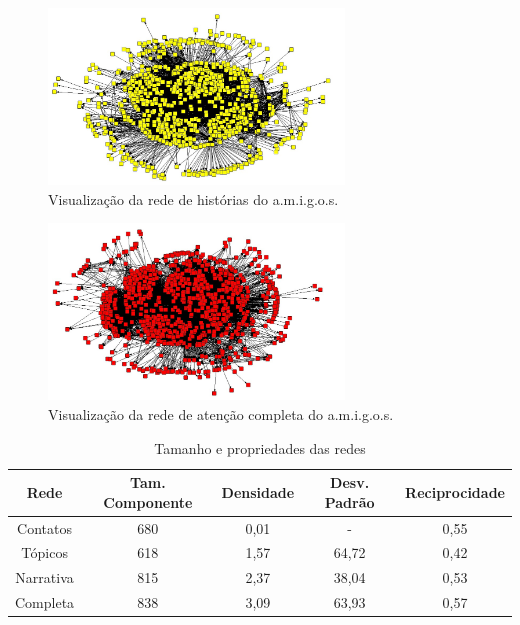 \begin{figure}[h!]
  \centering
    \includegraphics[width=0.7\textwidth]{imgs/narrativas.jpg}
  \caption{Visualização da rede de histórias do a.m.i.g.o.s.}
    \label{ap:fig:narrativas}
\end{figure}

\begin{figure}[h!]
  \centering
    \includegraphics[width=0.7\textwidth]{imgs/completa.jpg}
  \caption{Visualização da rede de atenção completa do a.m.i.g.o.s.}
    \label{ap:fig:completa}
\end{figure}

\begin{table} [htbp]
	\setlength{\arrayrulewidth}{2\arrayrulewidth}  %
	\setlength{\belowcaptionskip}{10pt}  %
	\caption{Tamanho e propriedades das redes} \centering   %
	\begin{tabular}{| c | c | c | c | c |}
	\hline
	Rede & Tam. Componente & Densidade & Desv. Padrão & Reciprocidade \\ \hline
	Contatos & 680 & 0,01 & - & 0,55 \\
	Tópicos & 618 & 1,57 & 64,72 & 0,42\\
	Narrativa & 815 & 2,37 & 38,04 & 0,53\\
	Completa & 838 & 3,09 & 63,93 & 0,57\\ \hline
	\end{tabular}
	\label{ap:tab:estatisticas}
\end{table}

